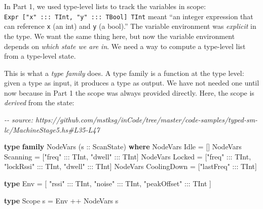 \documentclass[]{article}
\newenvironment{Shaded}{}{}
\newcommand{\CommentTok}[1]{\textcolor[rgb]{0.38,0.63,0.69}{\textit{#1}}}
\newcommand{\DataTypeTok}[1]{\textcolor[rgb]{0.56,0.13,0.00}{#1}}
\newcommand{\KeywordTok}[1]{\textcolor[rgb]{0.00,0.44,0.13}{\textbf{#1}}}
\newcommand{\NormalTok}[1]{#1}
\newcommand{\OperatorTok}[1]{\textcolor[rgb]{0.40,0.40,0.40}{#1}}
\newcommand{\OtherTok}[1]{\textcolor[rgb]{0.00,0.44,0.13}{#1}}
\newcommand{\StringTok}[1]{\textcolor[rgb]{0.25,0.44,0.63}{#1}}
\begin{document}
In Part 1, we used type-level lists to track the variables in scope:
\texttt{Expr\ {[}"x"\ :::\ TInt,\ "y"\ :::\ TBool{]}\ TInt} meant ``an integer
expression that can reference \texttt{x} (an int) and \texttt{y} (a bool).'' The
variable environment was \emph{explicit} in the type. We want the same thing
here, but now the variable environment depends on \emph{which state we are in}.
We need a way to compute a type-level list from a type-level state.

This is what a \emph{type family} does. A type family is a function at the type
level: given a type as input, it produces a type as output. We have not needed
one until now because in Part 1 the scope was always provided directly. Here,
the scope is \emph{derived} from the state:

\begin{Shaded}
\begin{Highlighting}[]
\CommentTok{{-}{-} source: https://github.com/mstksg/inCode/tree/master/code{-}samples/typed{-}sm{-}lc/MachineStage5.hs\#L35{-}L47}

\KeywordTok{type} \KeywordTok{family} \DataTypeTok{NodeVars}\NormalTok{ (}\OtherTok{s ::} \DataTypeTok{ScanState}\NormalTok{) }\KeywordTok{where}
  \DataTypeTok{NodeVars} \DataTypeTok{Idle} \OtherTok{=}\NormalTok{ \textquotesingle{}[]}
  \DataTypeTok{NodeVars} \DataTypeTok{Scanning} \OtherTok{=}\NormalTok{ \textquotesingle{}[}\StringTok{"freq"} \OperatorTok{:::} \DataTypeTok{TInt}\NormalTok{, }\StringTok{"dwell"} \OperatorTok{:::} \DataTypeTok{TInt}\NormalTok{]}
  \DataTypeTok{NodeVars} \DataTypeTok{Locked} \OtherTok{=}\NormalTok{ \textquotesingle{}[}\StringTok{"freq"} \OperatorTok{:::} \DataTypeTok{TInt}\NormalTok{, }\StringTok{"lockRssi"} \OperatorTok{:::} \DataTypeTok{TInt}\NormalTok{, }\StringTok{"dwell"} \OperatorTok{:::} \DataTypeTok{TInt}\NormalTok{]}
  \DataTypeTok{NodeVars} \DataTypeTok{CoolingDown} \OtherTok{=}\NormalTok{ \textquotesingle{}[}\StringTok{"lastFreq"} \OperatorTok{:::} \DataTypeTok{TInt}\NormalTok{]}

\KeywordTok{type} \DataTypeTok{Env} \OtherTok{=}
\NormalTok{  \textquotesingle{}[ }\StringTok{"rssi"} \OperatorTok{:::} \DataTypeTok{TInt}\NormalTok{,}
     \StringTok{"noise"} \OperatorTok{:::} \DataTypeTok{TInt}\NormalTok{,}
     \StringTok{"peakOffset"} \OperatorTok{:::} \DataTypeTok{TInt}
\NormalTok{   ]}

\KeywordTok{type} \DataTypeTok{Scope}\NormalTok{ s }\OtherTok{=} \DataTypeTok{Env} \OperatorTok{++} \DataTypeTok{NodeVars}\NormalTok{ s}
\end{Highlighting}
\end{Shaded}
\end{document}
